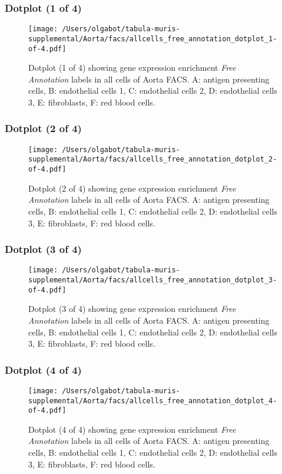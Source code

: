 \subsubsection{Dotplot (1 of 4)}
\begin{figure}[h]
\centering
\texttt{[image: /Users/olgabot/tabula-muris-supplemental/Aorta/facs/allcells\_free\_annotation\_dotplot\_1-of-4.pdf]}

\caption{ Dotplot (1 of 4)  showing gene expression enrichment \emph{Free Annotation} labels in all cells of Aorta FACS. A: antigen presenting cells, B: endothelial cells 1, C: endothelial cells 2, D: endothelial cells 3, E: fibroblasts, F: red blood cells.}
\end{figure}


\clearpage

\subsubsection{Dotplot (2 of 4)}
\begin{figure}[h]
\centering
\texttt{[image: /Users/olgabot/tabula-muris-supplemental/Aorta/facs/allcells\_free\_annotation\_dotplot\_2-of-4.pdf]}

\caption{ Dotplot (2 of 4)  showing gene expression enrichment \emph{Free Annotation} labels in all cells of Aorta FACS. A: antigen presenting cells, B: endothelial cells 1, C: endothelial cells 2, D: endothelial cells 3, E: fibroblasts, F: red blood cells.}
\end{figure}


\clearpage

\subsubsection{Dotplot (3 of 4)}
\begin{figure}[h]
\centering
\texttt{[image: /Users/olgabot/tabula-muris-supplemental/Aorta/facs/allcells\_free\_annotation\_dotplot\_3-of-4.pdf]}

\caption{ Dotplot (3 of 4)  showing gene expression enrichment \emph{Free Annotation} labels in all cells of Aorta FACS. A: antigen presenting cells, B: endothelial cells 1, C: endothelial cells 2, D: endothelial cells 3, E: fibroblasts, F: red blood cells.}
\end{figure}


\clearpage

\subsubsection{Dotplot (4 of 4)}
\begin{figure}[h]
\centering
\texttt{[image: /Users/olgabot/tabula-muris-supplemental/Aorta/facs/allcells\_free\_annotation\_dotplot\_4-of-4.pdf]}

\caption{ Dotplot (4 of 4)  showing gene expression enrichment \emph{Free Annotation} labels in all cells of Aorta FACS. A: antigen presenting cells, B: endothelial cells 1, C: endothelial cells 2, D: endothelial cells 3, E: fibroblasts, F: red blood cells.}
\end{figure}


